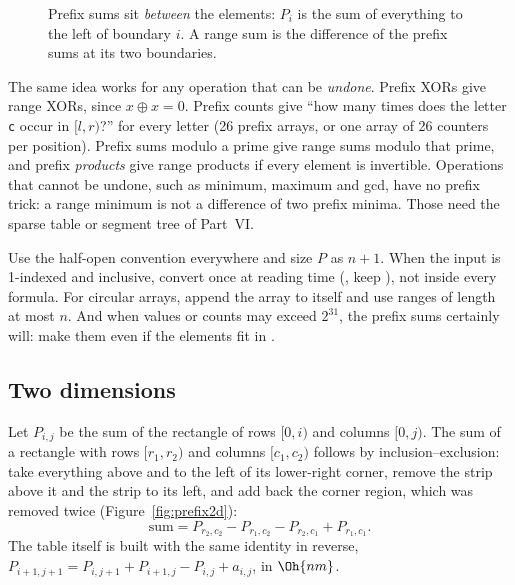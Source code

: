 \begin{figure}[htbp]
\centering
{}
\caption{Prefix sums sit \emph{between} the elements: $P_i$ is the sum of everything to the left of boundary $i$. A range sum
is the difference of the prefix sums at its two boundaries.}
\label{fig:prefix}
\end{figure}


The same idea works for any operation that can be \emph{undone}. Prefix XORs give range XORs, since $x \oplus x = 0$. Prefix
counts give ``how many times does the letter \texttt{c} occur in $[l, r)$?'' for every letter (26 prefix arrays, or one array
of 26 counters per position). Prefix sums modulo a prime give range sums modulo that prime, and prefix \emph{products} give range
products if every element is invertible. Operations that cannot be undone, such as minimum, maximum and gcd, have no prefix
trick: a range minimum is not a difference of two prefix minima. Those need the sparse table or segment tree of
Part~VI.

\begin{trick}
Use the half-open convention everywhere and size $P$ as $n + 1$. When the input is 1-indexed and inclusive, convert once at
reading time (, keep ), not inside every formula. For circular arrays, append the array to itself and use
ranges of length at most $n$. And when values or counts may exceed $2^{31}$, the prefix sums certainly will: make them
 even if the elements fit in .
\end{trick}

\subsection{Two dimensions}

Let $P_{i,j}$ be the sum of the rectangle of rows $[0, i)$ and columns $[0, j)$. The sum of a rectangle with rows $[r_1, r_2)$
and columns $[c_1, c_2)$ follows by inclusion--exclusion: take everything above and to the left of its lower-right corner,
remove the strip above it and the strip to its left, and add back the corner region, which was removed twice
(Figure~\ref{fig:prefix2d}):
\[
  \mathrm{sum} = P_{r_2, c_2} - P_{r_1, c_2} - P_{r_2, c_1} + P_{r_1, c_1} .
\]
The table itself is built with the same identity in reverse, $P_{i+1, j+1} = P_{i, j+1} + P_{i+1, j} - P_{i,j} + a_{i,j}$, in
$\Oh{nm}$.

